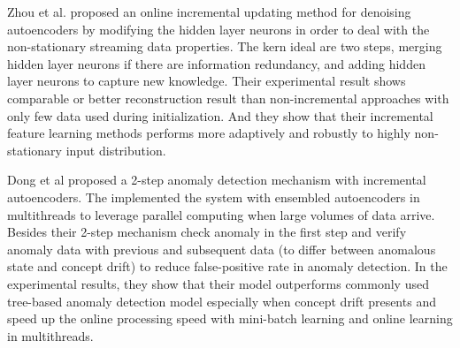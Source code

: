 Zhou et al. proposed an online incremental updating method for denoising autoencoders by modifying the hidden layer neurons in order to deal with the non-stationary streaming data properties. The kern ideal are two steps, merging hidden layer neurons if there are information redundancy, and adding hidden layer neurons to capture new knowledge. Their experimental result shows comparable or better reconstruction result than non-incremental approaches with only few data used during initialization. And they show that their incremental feature learning methods performs more adaptively and robustly to highly non-stationary input distribution.

Dong et al proposed a 2-step anomaly detection mechanism with incremental autoencoders. The implemented the system with ensembled autoencoders in multithreads to leverage parallel computing when large volumes of data arrive. Besides their 2-step mechanism check anomaly in the first step and verify anomaly data with previous and subsequent data (to differ between anomalous state and concept drift) to reduce false-positive rate in anomaly detection. In the experimental results, they show that their model outperforms commonly used tree-based anomaly detection model especially when concept drift presents and speed up the online processing speed with mini-batch learning and online learning in multithreads.







